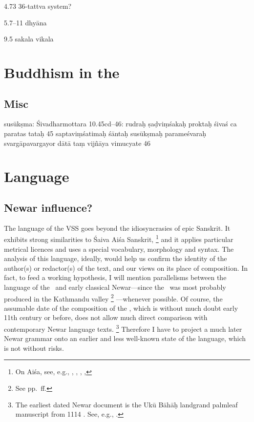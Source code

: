 4.73 36-tattva system?

5.7--11 dhyāna

9.5 sakala vikala

\section{Buddhism in the \VSS}


\subsection{Misc}

  susūkṣma: Śivadharmottara 10.45cd--46: rudraḥ ṣaḍviṃśakaḥ proktaḥ
  śivaś ca paratas tataḥ \textbar{}\textbar{} 45 \textbar{}\textbar{}
  saptaviṃśatimaḥ śāntaḥ susūkṣmaḥ parameśvaraḥ \textbar{}
  svargāpavargayor dātā taṃ vijñāya vimucyate \textbar{}\textbar{} 
  46
  







\section{Language}\label{language}

\subsection{Newar influence?}
\label{newar}

The language of the VSS goes beyond the idiosyncrasies of epic Sanskrit.
It exhibits strong similarities to Śaiva Aiśa Sanskrit,%
		\footnote{On Aiśa, see, e.g., , 
								  ,
						          , 
						          , 
						          } 
and it applies particular metrical licences and 
uses a special vocabulary, morphology and syntax.
The analysis of this language, ideally, would help us
confirm the identity of the author(s) or redactor(s) of the text, 
and our views on its place of composition. In fact, 
to feed a working hypothesis, I will mention parallelisms
between the language of the \VSS\ and early classical 
Newar---since the \VSS\ was most probably produced in the 
Kathmandu valley%
		\footnote{See pp.~\pageref{provenance}\thinspace ff.}%
---whenever possible. 
Of course, the assumable date
of the composition of the \VSS, which is without much doubt
early 11th century or before, does not allow much direct 
comparison with contemporary Newar language texts.%
	\footnote{The earliest dated Newar document is 
			the Ukū Bāhāḥ landgrand palmleaf manuscript from
			1114 \CE. See, e.g., .}
Therefore I have to project a much later Newar grammar
onto an earlier and less well-known 
state of the language, which is not without risks.

